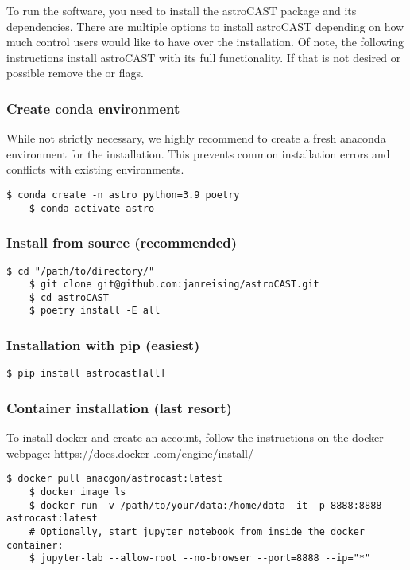 To run the software, you need to install the astroCAST package and its dependencies. There are multiple options to
install \ac{astroCAST} depending on how much control users would like to have over the installation. Of note, the
following instructions install astroCAST with its full functionality. If that is not desired or possible remove the  or \inlinepy{[all]} flags.

\subsubsection{Create conda environment}
While not strictly necessary, we highly recommend to create a fresh anaconda environment for the installation. This
prevents common installation errors and conflicts with existing environments.

\begin{lstlisting}[style=bashStyle]
    $ conda create -n astro python=3.9 poetry
    $ conda activate astro
\end{lstlisting}

\subsubsection{Install from source (recommended)}
\label{res:install-from-source}
\begin{lstlisting}[style=bashStyle]
    $ cd "/path/to/directory/"
    $ git clone git@github.com:janreising/astroCAST.git
    $ cd astroCAST
    $ poetry install -E all
\end{lstlisting}

\subsubsection{Installation with pip (easiest)}
\begin{lstlisting}[style=bashStyle]
    $ pip install astrocast[all]
\end{lstlisting}

\subsubsection{Container installation (last resort)}

To install docker and create an account, follow the instructions on the docker webpage: https://docs.docker
.com/engine/install/

\begin{lstlisting}[style=bashStyle]
    $ docker pull anacgon/astrocast:latest
    $ docker image ls
    $ docker run -v /path/to/your/data:/home/data -it -p 8888:8888 astrocast:latest
    # Optionally, start jupyter notebook from inside the docker container:
    $ jupyter-lab --allow-root --no-browser --port=8888 --ip="*"
\end{lstlisting}

